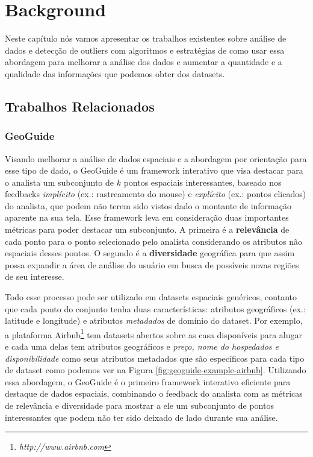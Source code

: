 \chapter{Background}


Neste capítulo nós vamos apresentar os trabalhos existentes sobre análise de dados e detecção de outliers com algoritmos e estratégias de como usar essa abordagem para melhorar a análise dos dados e aumentar a quantidade e a qualidade das informações que podemos obter dos datasets.

\section{Trabalhos Relacionados}

\subsection{GeoGuide}

Visando melhorar a análise de dados espaciais e a abordagem por orientação para esse tipo de dado, o GeoGuide \cite{omidvarTehrani2017} é um framework interativo que visa destacar para o analista um subconjunto de $k$ pontos espaciais interessantes, baseado nos feedbacks \textit{implícito} (ex.: rastreamento do mouse) e \textit{explícito} (ex.: pontos clicados) do analista, que podem não terem sido vistos dado o montante de informação aparente na sua tela. Esse framework leva em consideração duas importantes métricas para poder destacar um subconjunto. A primeira é a \textbf{relevância} de cada ponto para o ponto selecionado pelo analista considerando os atributos não espaciais desses pontos. O segundo é a \textbf{diversidade} geográfica para que assim possa expandir a área de análise do usuário em busca de possíveis novas regiões de seu interesse.

Todo esse processo pode ser utilizado em datasets espaciais genéricos, contanto que cada ponto do conjunto tenha duas características: atributos geográficos (ex.: latitude e longitude) e atributos \textit{metadados} de domínio do dataset. Por exemplo, a plataforma Airbnb\footnote{\it http://www.airbnb.com} tem datasets abertos sobre as casa disponíveis para alugar e cada uma delas tem atributos geográficos e \textit{preço, nome do hospedados e disponibilidade} como seus atributos metadados que são específicos para cada tipo de dataset como podemos ver na Figura \ref{fig:geoguide-example-airbnb}. Utilizando essa abordagem, o GeoGuide é o primeiro framework interativo eficiente para destaque de dados espaciais, combinando o feedback do analista com as métricas de relevância e diversidade para mostrar a ele um subconjunto de pontos interessantes que podem não ter sido deixado de lado durante sua análise.

